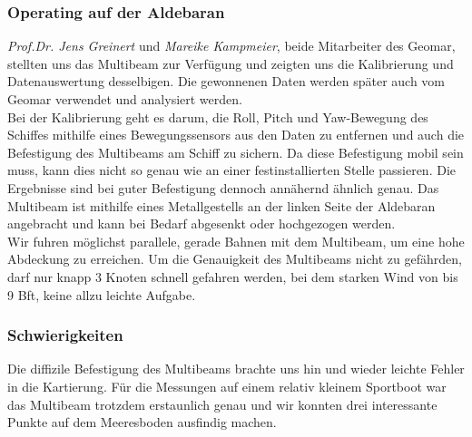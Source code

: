\subsubsection{Operating auf der Aldebaran}
\emph{Prof.Dr. Jens Greinert} und \emph{Mareike Kampmeier}, beide Mitarbeiter des Geomar, stellten uns das Multibeam zur Verfügung und zeigten uns die Kalibrierung und Datenauswertung desselbigen. Die gewonnenen Daten werden später auch vom Geomar verwendet und analysiert werden. \\

Bei der Kalibrierung geht es darum, die Roll, Pitch und Yaw-Bewegung des Schiffes mithilfe eines Bewegungssensors aus den Daten zu 
entfernen und auch die Befestigung des Multibeams am Schiff zu sichern. Da diese Befestigung mobil sein muss, kann
dies nicht so genau wie an einer festinstallierten Stelle passieren. Die Ergebnisse sind bei guter Befestigung dennoch annähernd ähnlich genau. 
Das Multibeam ist mithilfe eines Metallgestells an der linken Seite der Aldebaran angebracht und kann bei Bedarf 
abgesenkt oder hochgezogen werden.\\

Wir fuhren möglichst parallele, gerade Bahnen mit dem Multibeam, um eine hohe Abdeckung zu erreichen. 
Um die Genauigkeit des Multibeams nicht zu gefährden, darf nur knapp 3 Knoten schnell gefahren werden, bei dem starken Wind von bis 9 Bft, keine allzu leichte Aufgabe. \\

\subsubsection{Schwierigkeiten}
Die diffizile Befestigung des Multibeams brachte uns hin und wieder leichte Fehler in die Kartierung. Für die Messungen auf einem relativ kleinem Sportboot war das Multibeam trotzdem erstaunlich genau und wir konnten drei interessante Punkte auf dem 
Meeresboden ausfindig machen. \\

